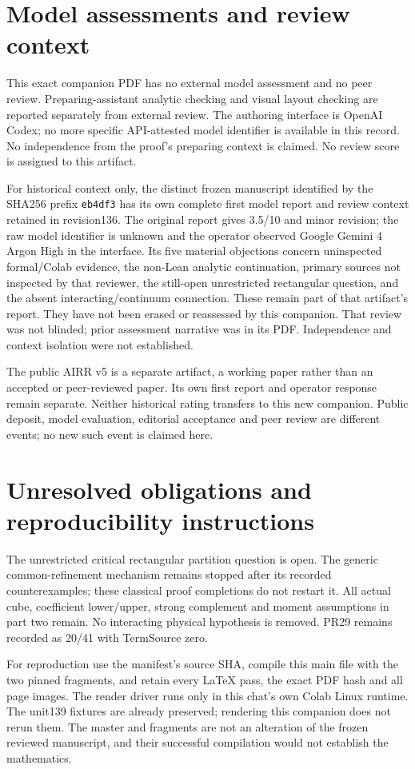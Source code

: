 \documentclass[11pt,a4paper]{article}
\begin{document}
\section{Model assessments and review context}
\label{sec:companion-review-context}
This exact companion PDF has no external model assessment and no peer
review. Preparing-assistant analytic checking and visual layout checking
are reported separately from external review. The authoring interface is
OpenAI Codex; no more specific API-attested model identifier is available
in this record. No independence from the proof's preparing context is
claimed. No review score is assigned to this artifact.

For historical context only, the distinct frozen manuscript identified by
the SHA256 prefix \texttt{eb4df3} has its own complete first model report and
review context retained in revision136. The original report gives
3.5/10 and minor revision; the raw model identifier is unknown and the
operator observed Google Gemini 4 Argon High in the interface. Its five
material objections concern uninspected formal/Colab evidence, the
non-Lean analytic continuation, primary sources not inspected by that
reviewer, the still-open unrestricted rectangular question, and the
absent interacting/continuum connection. These remain part of that
artifact's report. They have not been erased or reassessed by this
companion. That review was not blinded; prior assessment narrative was
in its PDF. Independence and context isolation were not established.

The public AIRR v5 is a separate artifact, a working paper rather than
an accepted or peer-reviewed paper. Its own first report and operator
response remain separate. Neither historical rating transfers to this
new companion. Public deposit, model evaluation, editorial acceptance
and peer review are different events; no new such event is claimed here.

\section{Unresolved obligations and reproducibility instructions}
The unrestricted critical rectangular partition question is open. The
generic common-refinement mechanism remains stopped after its recorded
counterexamples; these classical proof completions do not restart it.
All actual cube, coefficient lower/upper, strong complement and moment
assumptions in part two remain. No interacting physical hypothesis is
removed. PR29 remains recorded as 20/41 with TermSource zero.

For reproduction use the manifest's source SHA, compile this main file
with the two pinned fragments, and retain every LaTeX pass, the exact
PDF hash and all page images. The render driver runs only in this chat's
own Colab Linux runtime. The unit139 fixtures are already preserved;
rendering this companion does not rerun them. The master and fragments
are not an alteration of the frozen reviewed manuscript, and their
successful compilation would not establish the mathematics.
\end{document}
